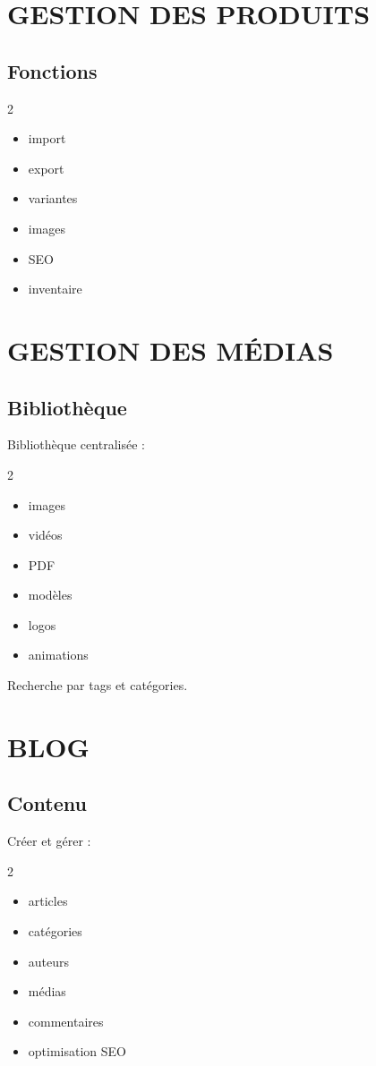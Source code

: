 \documentclass[12pt,a4paper,oneside]{book}
\begin{document}
\chapter{GESTION DES PRODUITS}

\section{Fonctions}
\begin{multicols}{2}
\begin{itemize}
\item import
\item export
\item variantes
\item images
\item SEO
\item inventaire
\end{itemize}
\end{multicols}

\chapter{GESTION DES MÉDIAS}

\section{Bibliothèque}
Bibliothèque centralisée :
\begin{multicols}{2}
\begin{itemize}
\item images
\item vidéos
\item PDF
\item modèles
\item logos
\item animations
\end{itemize}
\end{multicols}

Recherche par tags et catégories.

\chapter{BLOG}

\section{Contenu}
Créer et gérer :
\begin{multicols}{2}
\begin{itemize}
\item articles
\item catégories
\item auteurs
\item médias
\item commentaires
\item optimisation SEO
\end{itemize}
\end{multicols}
\end{document}
